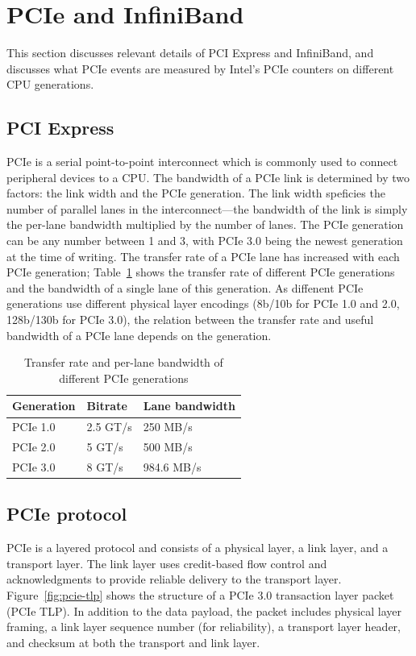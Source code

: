 \section{PCIe and InfiniBand}
\label{sec:pcie}

This section discusses relevant details of PCI Express and InfiniBand, and
discusses what PCIe events are measured by Intel's PCIe counters on different
CPU generations.

\subsection{PCI Express}
PCIe is a serial point-to-point interconnect which is commonly used to connect
peripheral devices to a CPU. The bandwidth of a PCIe link is determined by two
factors: the link width and the PCIe generation. The link width speficies the
number of parallel lanes in the interconnect---the bandwidth of the link is
simply the per-lane bandwidth multiplied by the number of lanes. The PCIe
generation can be any number between 1 and 3, with PCIe 3.0 being the newest
generation at the time of writing. The transfer rate of a PCIe lane has
increased with each PCIe generation; Table~\ref{table:pcie} shows the transfer
rate of different PCIe generations and the bandwidth of a single lane of this
generation. As diffenent PCIe generations use different physical layer encodings
(8b/10b for PCIe 1.0 and 2.0, 128b/130b for PCIe 3.0), the relation between the
transfer rate and useful bandwidth of a PCIe lane depends on the generation. 

\begin{table}
\begin{center}
    \begin{tabular}{p{2.5cm} p{1.5cm} p{2.5cm}}
	\textbf{Generation} & \textbf{Bitrate} & \textbf{Lane bandwidth}\\
    \hline
	PCIe 1.0 & 2.5 GT/s & 250 MB/s \\
	PCIe 2.0 & 5 GT/s & 500 MB/s \\
	PCIe 3.0 & 8 GT/s & 984.6 MB/s \\
    \end{tabular}
\caption{Transfer rate and per-lane bandwidth of different PCIe generations}
\label{table:pcie}
\end{center}
\end{table}

\subsection{PCIe protocol}
PCIe is a layered protocol and consists of a physical layer, a link layer,
and a transport layer. The link layer uses credit-based flow control and
acknowledgments to provide reliable delivery to the transport layer.
Figure~\ref{fig:pcie-tlp} shows the structure of a PCIe 3.0 transaction layer
packet (PCIe TLP). In addition to the data payload, the packet includes physical
layer framing, a link layer sequence number (for reliability), a transport layer
header, and checksum at both the transport and link layer.

